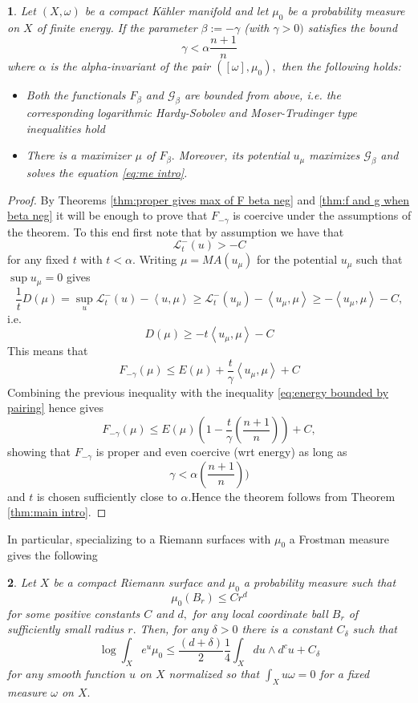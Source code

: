 \documentclass[11pt,oneside,english]{amsart}
\numberwithin{equation}{section}
\numberwithin{figure}{section}
\theoremstyle{plain}
\newtheorem{thm}{\protect\theoremname}[section]
\theoremstyle{plain}
\newtheorem{cor}[thm]{\protect\corollaryname}
\theoremstyle{plain}
\theoremstyle{plain}
\theoremstyle{remark}
\theoremstyle{definition}
\providecommand{\corollaryname}{Corollary}
\providecommand{\theoremname}{Theorem}
\begin{document}
\begin{thm}
\label{thm:alpha invariant intro}Let $(X,\omega)$ be a compact Kähler
manifold and let $\mu_{0}$ be a probability measure on $X$ of finite
energy. If the parameter $\beta:=-\gamma$ (with $\gamma>0)$ satisfies
the bound 
\begin{equation}
\gamma<\alpha\frac{n+1}{n}\label{eq:cond on beta in thm alpha intro}
\end{equation}
 where $\alpha$ is the alpha-invariant of the pair $([\omega],\mu_{0}),$
then the following holds: 
\begin{itemize}
\item Both the functionals $F_{\beta}$ and $\mathcal{G}_{\beta}$ are bounded
from above, i.e. the corresponding\emph{ logarithmic Hardy-Sobolev}
and \emph{ Moser-Trudinger }type inequalities hold 
\item There is a maximizer $\mu$ of $F_{\beta}.$ Moreover, its potential
$u_{\mu}$ maximizes $\mathcal{G}_{\beta}$ and solves the  equation
\ref{eq:me intro}. 
\end{itemize}
\end{thm}
\begin{proof}
By Theorems \ref{thm:proper gives max of F beta neg} and \ref{thm:f and g when beta neg}
it will be enough to prove that $F_{-\gamma}$ is coercive under the
assumptions of the theorem. To this end first note that by assumption
we have that 
\[
\mathcal{L}_{t}^{-}(u)>-C
\]
 for any fixed $t$ with $t<\alpha.$ Writing $\mu=MA(u_{\mu})$ for
the potential $u_{\mu}$ such that $\sup u_{\mu}=0$ gives 
\[
\frac{1}{t}D(\mu)=\sup_{u}\mathcal{L}_{t}^{-}(u)-\left\langle u,\mu\right\rangle \geq\mathcal{L}_{t}^{-}(u_{\mu})-\left\langle u_{\mu},\mu\right\rangle \geq-\left\langle u_{\mu},\mu\right\rangle -C,
\]
 i.e. 
\[
D(\mu)\geq-t\left\langle u_{\mu},\mu\right\rangle -C
\]
 This means that 
\[
F_{-\gamma}(\mu)\leq E(\mu)+\frac{t}{\gamma}\left\langle u_{\mu},\mu\right\rangle +C
\]
 Combining the previous inequality with the inequality \ref{eq:energy bounded by pairing}
hence gives 
\[
F_{-\gamma}(\mu)\leq E(\mu)(1-\frac{t}{\gamma}(\frac{n+1}{n}))+C,
\]
 showing that $F_{-\gamma}$ is proper and even coercive (wrt energy)
as long as 
\[
\gamma<\alpha(\frac{n+1}{n}))
\]
 and $t$ is chosen sufficiently close to $\alpha.$Hence the theorem
follows from Theorem \ref{thm:main intro}.
\end{proof}
In particular, specializing to a Riemann surfaces with $\mu_{0}$
a Frostman measure gives the following 
\begin{cor}
\label{cor:m-t on rieman sur intro}Let $X$ be a compact Riemann
surface and $\mu_{0}$ a probability measure such that 
\[
\mu_{0}(B_{r})\leq Cr^{d}
\]
 for some positive constants $C$ and $d,$ for any local coordinate
ball $B_{r}$ of sufficiently small radius $r.$ Then, for any $\delta>0$
there is a constant $C_{\delta}$ such that 
\[
\log\int_{X}e^{u}\mu_{0}\leq\frac{(d+\delta)}{2}\frac{1}{4}\int_{X}du\wedge d^{c}u+C_{\delta}
\]
 for any smooth function $u$ on $X$ normalized so that $\int_{X}u\omega=0$
for a fixed measure $\omega$ on $X.$ \end{cor}
\end{document}
